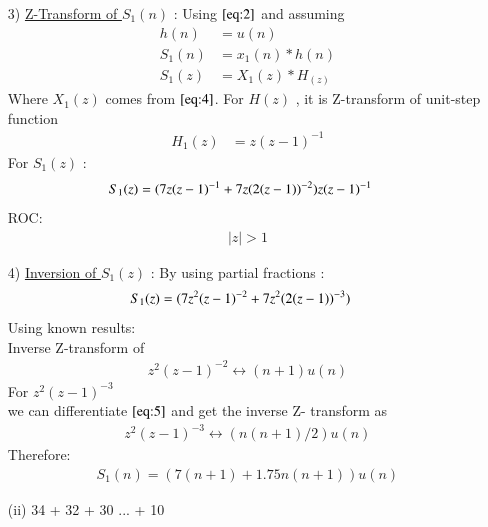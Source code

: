 \documentclass[journal,12pt,twocolumn]{IEEEtran}
\theoremstyle{remark}
\begin{document}
\begin{enumerate}
\vspace{0.7cm}
\item[3)]
\underline{Z-Transform of $S_1(n)$} :
Using $\eqref{eq:2}$ and assuming 
\begin{align}
         h(n) &= u(n) \\
    S_1(n) &= x_1(n) * h(n) \\
    S_1(z) &= X_1(z) * H_(z)
    \end{align}
    Where $X_1(z)$ comes from $\eqref{eq:4}$.
    \vspace{0.05cm}
    For $H(z)$ , it is Z-transform of unit-step function
    \begin{align}
        H_1(z) &= z(z-1)^{-1} \label{eq:9}
    \end{align}
    For $S_1(z)$ :
    \begin{align}
S_1(z) &= \notag(7z(z-1)^{-1}+
7z(2(z-1))^{-2})z(z-1)^{-1}
    \end{align}
    ROC:
    \begin{align} 
    \lvert z \rvert > 1
    \end{align}
    
    \item[4)]
\underline{Inversion of $S_1(z)$} :
By using partial fractions :
\begin{align}
    S_1(z) &= \notag(7z^2(z-1)^{-2} + 7z^2(2(z-1))^{-3}) 
\end{align}
Using known results:\\
  Inverse Z-transform of
\begin{align}
        z^2(z-1)^{-2} \leftrightarrow (n+1)u(n)\label{eq:5}
\end{align}
    For $z^2(z-1)^{-3}$\\
    
    we can differentiate $\eqref{eq:5}$ and get the inverse Z- transform as 
    \begin{align}
          z^2(z-1)^{-3} \leftrightarrow (n(n+1)/2)u(n) \label{eq:7}
    \end{align}
    Therefore:
\begin{align}
 S_1(n) = (7(n+1) + 1.75n(n+1))u(n)
\end{align}

    











\vspace{0.5cm}
\item[(ii)]
 34 + 32 + 30 ... + 10\vspace{0.05cm}
\vspace{0.2cm}


\end{enumerate}
\end{document}
